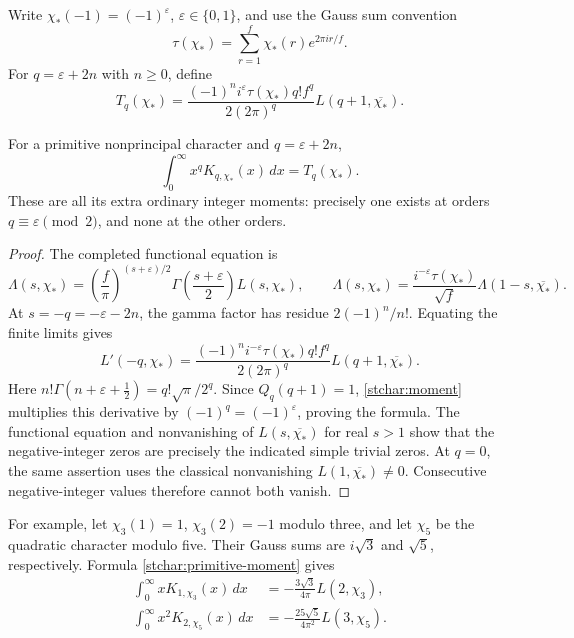 Write $\chi_*(-1)=(-1)^\varepsilon$, $\varepsilon\in\{0,1\}$,
and use the Gauss sum convention
\[
 \tau(\chi_*)=\sum_{r=1}^f\chi_*(r)e^{2\pi ir/f}.
\]
For $q=\varepsilon+2n$ with $n\ge0$, define
\begin{equation}\label{stchar:constant}
 T_q(\chi_*)=
   \frac{(-1)^n i^\varepsilon\tau(\chi_*)q!f^q}
        {2(2\pi)^q}L(q+1,\overline{\chi_*}).
\end{equation}
\begin{theorem}
\label{stchar:primitive}
For a primitive nonprincipal character and $q=\varepsilon+2n$,
\begin{equation}\label{stchar:primitive-moment}
 \boxed{\displaystyle\int_0^\infty x^qK_{q,\chi_*}(x)\,dx
       =T_q(\chi_*).}
\end{equation}
These are all its extra ordinary integer moments: precisely one exists
at orders $q\equiv\varepsilon\pmod2$, and none at the other orders.
\end{theorem}
\begin{proof}
The completed functional equation is
\[
 \Lambda(s,\chi_*)=
  \left(\frac f\pi\right)^{(s+\varepsilon)/2}
       \Gamma\left(\frac{s+\varepsilon}2\right)L(s,\chi_*),
 \qquad
 \Lambda(s,\chi_*)=
       \frac{i^{-\varepsilon}\tau(\chi_*)}{\sqrt f}
       \Lambda(1-s,\overline{\chi_*}).
\]
At $s=-q=-\varepsilon-2n$, the gamma factor has residue
$2(-1)^n/n!$.  Equating the finite limits gives
\[
 L'(-q,\chi_*)=
 \frac{(-1)^n i^{-\varepsilon}\tau(\chi_*)q!f^q}
      {2(2\pi)^q}L(q+1,\overline{\chi_*}).
\]
Here $n!\Gamma(n+\varepsilon+\tfrac12)=q!\sqrt\pi/2^q$.
Since $Q_q(q+1)=1$, \eqref{stchar:moment} multiplies this derivative
by $(-1)^q=(-1)^\varepsilon$, proving the formula.
The functional equation and nonvanishing of $L(s,\overline{\chi_*})$
for real $s>1$ show that the negative-integer zeros are precisely
the indicated simple trivial zeros.  At $q=0$, the same assertion
uses the classical nonvanishing $L(1,\overline{\chi_*})\ne0$.
Consecutive negative-integer values therefore cannot both vanish.
\end{proof}

For example, let $\chi_3(1)=1$, $\chi_3(2)=-1$ modulo three,
and let $\chi_5$ be the quadratic character modulo five.  Their
Gauss sums are $i\sqrt3$ and $\sqrt5$, respectively.  Formula
\eqref{stchar:primitive-moment} gives
\begin{align}
 \int_0^\infty xK_{1,\chi_3}(x)\,dx
     &=-\frac{3\sqrt3}{4\pi}L(2,\chi_3),\label{stchar:mod3}\\
 \int_0^\infty x^2K_{2,\chi_5}(x)\,dx
     &=-\frac{25\sqrt5}{4\pi^2}L(3,\chi_5).
       \label{stchar:mod5}
\end{align}

